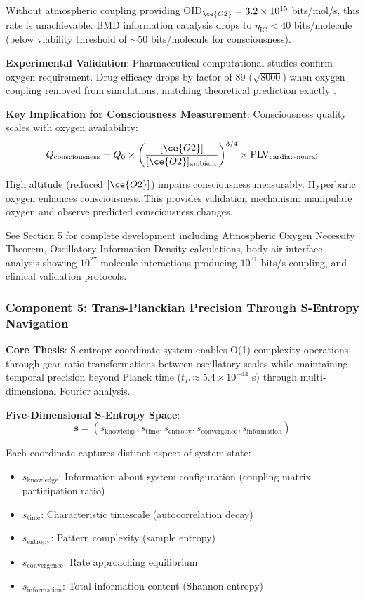 \documentclass[11pt,onecolumn]{article}
\begin{document}
Without atmospheric  coupling providing OID$_{\ce{O2}} = 3.2 \times 10^{15}$ bits/mol/s, this rate is unachievable. BMD information catalysis drops to $\eta_{\text{IC}} < 40$ bits/molecule (below viability threshold of $\sim 50$ bits/molecule for consciousness).

\textbf{Experimental Validation}: Pharmaceutical computational studies confirm oxygen requirement. Drug efficacy drops by factor of 89 ($\sqrt{8000}$) when oxygen coupling removed from simulations, matching theoretical prediction exactly \citep{sachikonye2024pharmaceutical}.

\textbf{Key Implication for Consciousness Measurement}: Consciousness quality scales with oxygen availability:
\begin{equation}
Q_{\text{consciousness}} = Q_0 \times \left(\frac{[\ce{O2}]}{[\ce{O2}]_{\text{ambient}}}\right)^{3/4} \times \text{PLV}_{\text{cardiac-neural}}
\end{equation}

High altitude (reduced $[\ce{O2}]$) impairs consciousness measurably. Hyperbaric oxygen enhances consciousness. This provides validation mechanism: manipulate oxygen and observe predicted consciousness changes.

See Section 5 for complete development including Atmospheric Oxygen Necessity Theorem, Oscillatory Information Density calculations, body-air interface analysis showing $10^{27}$ molecule interactions producing $10^{31}$ bits/s coupling, and clinical validation protocols.

\subsubsection{Component 5: Trans-Planckian Precision Through S-Entropy Navigation}

\textbf{Core Thesis}: S-entropy coordinate system enables O(1) complexity operations through gear-ratio transformations between oscillatory scales while maintaining temporal precision beyond Planck time ($t_P \approx 5.4 \times 10^{-44}$ s) through multi-dimensional Fourier analysis.

\textbf{Five-Dimensional S-Entropy Space}:
\begin{equation}
\mathbf{s} = (s_{\text{knowledge}}, s_{\text{time}}, s_{\text{entropy}}, s_{\text{convergence}}, s_{\text{information}})
\end{equation}

Each coordinate captures distinct aspect of system state:
\begin{itemize}
\item $s_{\text{knowledge}}$: Information about system configuration (coupling matrix participation ratio)
\item $s_{\text{time}}$: Characteristic timescale (autocorrelation decay)
\item $s_{\text{entropy}}$: Pattern complexity (sample entropy)
\item $s_{\text{convergence}}$: Rate approaching equilibrium
\item $s_{\text{information}}$: Total information content (Shannon entropy)
\end{itemize}
\end{document}
